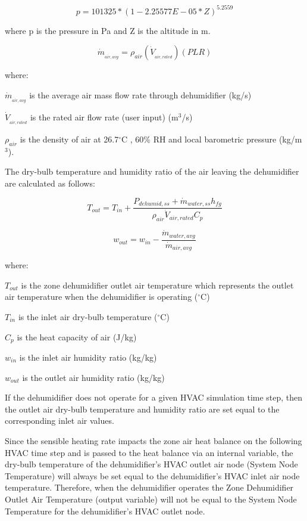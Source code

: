 \begin{equation}
p = 101325*(1-2.25577E-05*Z)^{5.2559}
\end{equation}

where p is the pressure in Pa and Z is the altitude in m.

\begin{equation}
{\dot m_{_{air,avg}}} = {\rho_{air}}\left( {{{\dot V}_{_{air,rated}}}} \right)\left( {PLR} \right)
\end{equation}

where:

\({\dot m_{_{air,avg}}}\) is the average air mass flow rate through dehumidifier (kg/s)

\({\dot V_{_{air,rated}}}\) is the rated air flow rate (user input) (m\(^{3}\)/s)

\({\rho_{air}}\) is the density of air at 26.7\(^{\circ}\)C , 60\% RH and local barometric pressure (kg/m\(^{3}\)).

The dry-bulb temperature and humidity ratio of the air leaving the dehumidifier are calculated as follows:

\begin{equation}
  T_{out} = T_{in} + \frac{P_{dehumid,ss} + \dot{m}_{water,ss} h_{fg}} {\rho_{air} \dot{V}_{air,rated} C_p}
\end{equation}

\begin{equation}
  w_{out} = w_{in} - \frac{\dot{m}_{water,avg}}{\dot{m}_{air,avg}}
\end{equation}

where:

\(T_{out}\) is the zone dehumidifier outlet air temperature which represents the outlet air temperature when the dehumidifier is operating (\(^{\circ}\)C)

\(T_{in}\) is the inlet air dry-bulb temperature (\(^{\circ}\)C)

\({C_p}\) is the heat capacity of air (J/kg)

\(w_{in}\) is the inlet air humidity ratio (kg/kg)

\(w_{out}\) is the outlet air humidity ratio (kg/kg)

If the dehumidifier does not operate for a given HVAC simulation time step, then the outlet air dry-bulb temperature and humidity ratio are set equal to the corresponding inlet air values.

Since the sensible heating rate impacts the zone air heat balance on the following HVAC time step and is passed to the heat balance via an internal variable, the dry-bulb temperature of the dehumidifier's HVAC outlet air node (System Node Temperature) will always be set equal to the dehumidifier's HVAC inlet air node temperature. Therefore, when the dehumidifier operates the Zone Dehumidifier Outlet Air Temperature (output variable) will not be equal to the System Node Temperature for the dehumidifier's HVAC outlet node.

